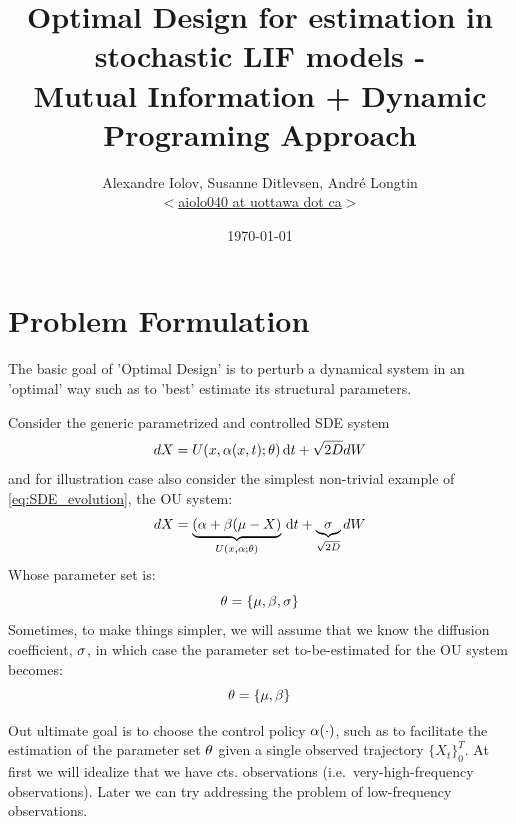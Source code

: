 \documentclass{article}
\begin{document}
\title{Optimal Design for estimation in stochastic LIF models - \\ Mutual
Information + Dynamic Programing Approach} \author{Alexandre Iolov, Susanne
Ditlevsen, Andr\'e Longtin \\ $<$\href{mailto:aiolo040@uottawa.ca}
		{aiolo040 at uottawa dot ca}$>$}

\date{\today}

\maketitle


\tableofcontents 

\section{Problem Formulation}
The basic goal of 'Optimal Design' is to perturb a dynamical system in an
'optimal' way such as to 'best' estimate its structural parameters.

Consider the generic parametrized and controlled SDE system 
\begin{equation}
dX = U(x,{\alpha}(x,t); {\theta}) \, \mathrm{d} t + \sqrt{2D} dW
\label{eq:SDE_evolution} 
\end{equation}
and for illustration case also consider the simplest non-trivial example of
\cref{eq:SDE_evolution}, the OU system:
\begin{equation}
dX = \underbrace{({\alpha} + {\beta}( \mu - X)}_{U(x,{\alpha}; {\theta})} \, \mathrm{d} t +
\underbrace{{\sigma }}_{\sqrt{2D}} dW
\label{eq:OU_evolution} 
\end{equation}
Whose parameter set is:
$$
{\theta} = \{{\mu }, {\beta}, {\sigma }\}
$$
Sometimes, to make things simpler, we will assume that we know the diffusion
coefficient, ${\sigma }$, in which case the parameter set to-be-estimated for the OU
system becomes: 
$$
{\theta} = \{{\mu }, {\beta}\}
$$ 

Out ultimate goal is to choose the control policy ${\alpha}(\cdot)$, such as to
facilitate the estimation of the parameter set ${\theta}$ given a single observed
trajectory $\{X_t\}_0^T$. At first we will idealize that we have cts.
observations (i.e.\ very-high-frequency observations). Later we can try
addressing the problem of low-frequency observations. 
\end{document}
